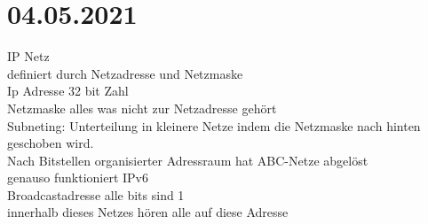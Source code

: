 \documentclass{article}
\begin{document}
	\section*{04.05.2021}
	IP Netz \\
	definiert durch Netzadresse und Netzmaske \\
	Ip Adresse 32 bit Zahl \\
	Netzmaske alles was nicht zur Netzadresse gehört \\
	Subneting: Unterteilung in kleinere Netze indem die Netzmaske nach hinten geschoben wird. \\
	Nach Bitstellen organisierter Adressraum hat ABC-Netze abgelöst \\
	genauso funktioniert IPv6 \\
	Broadcastadresse alle bits sind 1 \\
	innerhalb dieses Netzes hören alle auf diese Adresse \\
\end{document}
